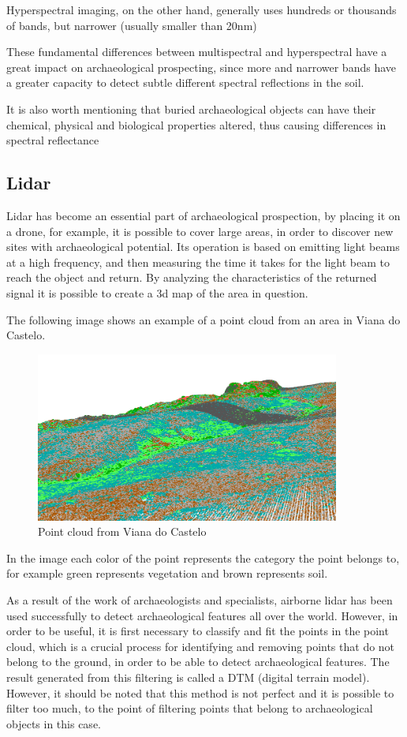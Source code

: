 Hyperspectral imaging, on the other hand, generally uses hundreds or thousands of bands, but narrower (usually smaller than 20nm)

These fundamental differences between multispectral and hyperspectral have a great impact on archaeological prospecting, since more and narrower bands have a greater capacity to detect subtle different spectral reflections in the soil.

It is also worth mentioning that buried archaeological objects can have their chemical, physical and biological properties altered, thus causing differences in spectral reflectance


\subsection{Lidar}
Lidar has become an essential part of archaeological prospection, by placing it on a drone, for example, it is possible to cover large areas, in order to discover new sites with archaeological potential.  Its operation is based on emitting light beams at a high frequency, and then measuring the time it takes for the light beam to reach the object and return.
By analyzing the characteristics of the returned signal it is possible to create a 3d map of the area in question.

The following image shows an example of a point cloud from an area in Viana do Castelo.

\begin{figure}[H]
\centering
\includegraphics[width=10cm]{images/pointcloudViana.png}
\caption{Point cloud from Viana do Castelo}
\end{figure}

In the image each color of the point represents the category the point belongs to, for example green represents vegetation and brown represents soil.

As a result of the work of archaeologists and specialists, airborne lidar has been used successfully to detect archaeological features all over the world. However, in order to be useful, it is first necessary to classify and fit the points in the point cloud, which is a crucial process for identifying and removing points that do not belong to the ground, in order to be able to detect archaeological features. The result generated from this filtering is called a DTM (digital terrain model). However, it should be noted that this method is not perfect and it is possible to filter too much, to the point of filtering points that belong to archaeological objects in this case.

